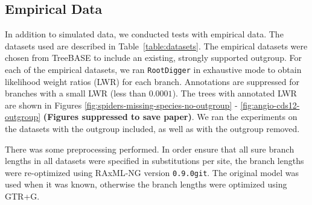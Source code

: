 \documentclass{article}
\newcommand{\RootDiggertt}{\texttt{RootDigger}}
\newcommand{\BenComment}[1]{{\bf \color{blue} ({#1})}}
\begin{document}
%
%
%

\subsection{Empirical Data}

In addition to simulated data, we conducted tests with empirical data. The
datasets used are described in Table~\ref{table:datasets}.  The empirical
datasets were chosen from TreeBASE \cite{piel2009treebase, vos_nexml_2012} to
include an existing, strongly supported outgroup.  For each of the empirical
datasets, we ran \RootDiggertt{} in exhaustive mode to obtain likelihood weight
ratios (LWR) for each branch.  Annotations are suppressed for branches with a
small LWR (less than $0.0001$).  The trees with annotated LWR are shown in
Figures \ref{fig:spiders-missing-species-no-outgroup} -
\ref{fig:angio-cds12-outgroup} \BenComment{Figures suppressed to save paper}.
We ran the experiments on the datasets with the outgroup included, as well as
with the outgroup removed.

There was some preprocessing performed. In order ensure that all sure branch
lengths in all datasets were specified in substitutions per site, the branch
lengths were re-optimized using RAxML-NG \cite{kozlov_raxml-ng:_2019} version
\texttt{0.9.0git}. The original model was used when it was
known, otherwise the branch lengths were optimized
using GTR+G.
\end{document}
